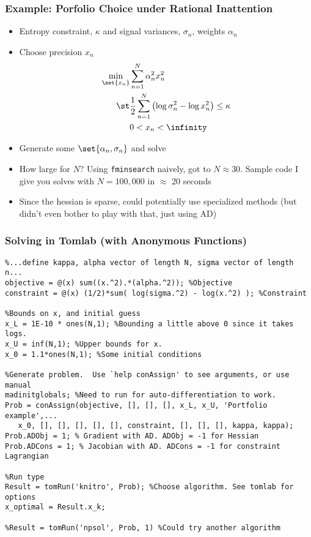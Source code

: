 \documentclass[nofootline]{etk-presentation}
\begin{document}
\begin{frame}[fragile]	\frametitle{Example: Porfolio Choice under Rational Inattention}
	\begin{itemize}
		\item Entropy constraint, $\kappa$ and signal variances, $\sigma_n$, weights $\alpha_n$
		\item Choose precision $x_n$ 
\begin{align*}
\min_{\set{x_n}}&\sum_{n=1}^N \alpha_n^2 x_n^2\\
\st & \frac{1}{2}\sum_{n=1}^{N}\left(\log\sigma^2_n -  \log x^2_n\right) \leq \kappa\\
& 0 < x_n < \infinity
\end{align*}
		\item Generate some $\set{\alpha_n,\sigma_n}$ and solve
		\item How large for $N$?  Using \verb!fminsearch! naively, got to $N\approx 30$.  Sample code I give you solves with $N = 100,000$ in $\approx$ 20 seconds
		\item Since the hessian is sparse, could potentially use specialized methods (but didn't even bother to play with that, just using AD)
	\end{itemize}
\end{frame}

\begin{frame}[fragile]	\frametitle{Solving in Tomlab (with Anonymous Functions)}
\begin{verbatim}
%...define kappa, alpha vector of length N, sigma vector of length n...
objective = @(x) sum((x.^2).*(alpha.^2)); %Objective
constraint = @(x) (1/2)*sum( log(sigma.^2) - log(x.^2) ); %Constraint

%Bounds on x, and initial guess
x_L = 1E-10 * ones(N,1); %Bounding a little above 0 since it takes logs.
x_U = inf(N,1); %Upper bounds for x.
x_0 = 1.1*ones(N,1); %Some initial conditions

%Generate problem.  Use `help conAssign' to see arguments, or use manual
madinitglobals; %Need to run for auto-differentiation to work.
Prob = conAssign(objective, [], [], [], x_L, x_U, 'Portfolio example',...
   x_0, [], [], [], [], [], constraint, [], [], [], kappa, kappa);
Prob.ADObj = 1; % Gradient with AD. ADObj = -1 for Hessian
Prob.ADCons = 1; % Jacobian with AD. ADCons = -1 for constraint Lagrangian 

%Run type
Result = tomRun('knitro', Prob); %Choose algorithm. See tomlab for options
x_optimal = Result.x_k;

%Result = tomRun('npsol', Prob, 1) %Could try another algorithm

\end{verbatim}
\end{frame}
\end{document}
